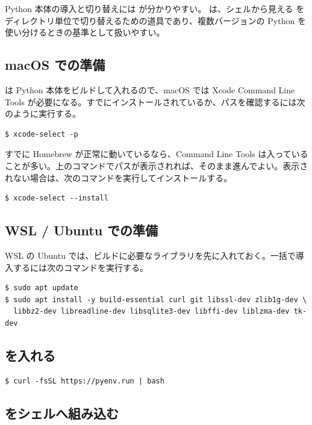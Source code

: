 Python 本体の導入と切り替えには  が分かりやすい。 は、シェルから見える  をディレクトリ単位で切り替えるための道具であり、複数バージョンの Python を使い分けるときの基準として扱いやすい。

\subsection{macOS での準備}

 は Python 本体をビルドして入れるので、macOS では Xcode Command Line Tools が必要になる。すでにインストールされているか、パスを確認するには次のように実行する。

\begin{lstlisting}[numbers=none, xleftmargin=2\zw]
$ xcode-select -p
\end{lstlisting}

すでに Homebrew が正常に動いているなら、Command Line Tools は入っていることが多い。上のコマンドでパスが表示されれば、そのまま進んでよい。表示されない場合は、次のコマンドを実行してインストールする。

\begin{lstlisting}[numbers=none, xleftmargin=2\zw]
$ xcode-select --install
\end{lstlisting}

\subsection{WSL / Ubuntu での準備}

WSL の Ubuntu では、ビルドに必要なライブラリを先に入れておく。一括で導入するには次のコマンドを実行する。

\begin{lstlisting}[numbers=none, xleftmargin=2\zw]
$ sudo apt update
$ sudo apt install -y build-essential curl git libssl-dev zlib1g-dev \
  libbz2-dev libreadline-dev libsqlite3-dev libffi-dev liblzma-dev tk-dev
\end{lstlisting}

\subsection{ を入れる}

\begin{lstlisting}[numbers=none, xleftmargin=2\zw]
$ curl -fsSL https://pyenv.run | bash
\end{lstlisting}

\subsection{ をシェルへ組み込む}

